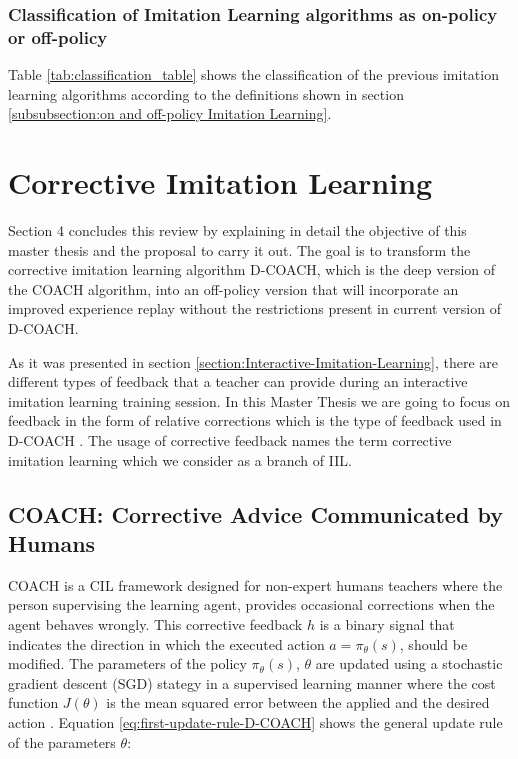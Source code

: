 \subsubsection{Classification of Imitation Learning algorithms as on-policy or off-policy}
\label{subsubsection:Classification of Imitation Learning algorithms as on-policy or off-policy}

Table \ref{tab:classification_table} shows the classification of the previous imitation learning algorithms according to the definitions shown in section \ref{subsubsection:on and off-policy Imitation Learning}.






\section{Corrective Imitation Learning}
\label{section:TCorrective Imitation Learning}


Section 4 concludes this review by explaining in detail the objective of this master thesis and the proposal to carry it out. 
The goal is to transform the corrective imitation learning algorithm D-COACH, which is the deep version of the COACH algorithm, into an off-policy version that will incorporate an improved experience replay without the restrictions present in current version of D-COACH.





As it was presented in section \ref{section:Interactive-Imitation-Learning}, there are different types of feedback that a teacher can provide during an interactive imitation learning training session. In this Master Thesis we are going to focus on feedback in the form of relative corrections which is the type of feedback used in D-COACH \cite{D-COACH-Dattari-Celemin-Ruiz-del-Solar-Kober:2018}. The usage of corrective feedback names the term corrective imitation learning which we consider as a branch of IIL.


\subsection{COACH: Corrective Advice Communicated by Humans}
\label{subsection:COACH}

COACH \cite{COACH-Celemin-Ruiz-del-Solar:2015} is a CIL framework designed for non-expert humans teachers where the person supervising the learning agent, provides occasional corrections when the agent behaves wrongly. This corrective feedback $h$ is a binary signal that indicates the direction in which the executed action $a = \pi_\theta(s)$, should be modified.
The parameters of the policy $\pi_\theta(s)$, $\theta$ are updated using a stochastic gradient descent (SGD) stategy in a supervised learning manner where the cost function $J(\theta)$ is the mean squared error between the applied and the desired action \cite{Gaussian-COACH-wout:2019}. Equation \ref{eq:first-update-rule-D-COACH} shows the general update rule of the parameters $\theta$:


